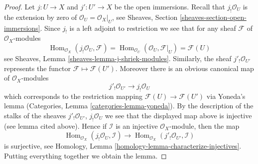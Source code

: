 \documentclass[10pt,a4paper]{amsart}
\theoremstyle{plain}
\theoremstyle{definition}
\theoremstyle{remark}
\numberwithin{equation}{subsection}
\def\Hom{\mathop{\mathrm{Hom}}\nolimits}
\begin{document}
\begin{proof}
Let $j : U \to X$ and $j' : U' \to X$ be the open immersions.
Recall that $j_!\mathcal{O}_U$ is the extension by zero of
$\mathcal{O}_U = \mathcal{O}_X|_U$, see
Sheaves, Section \ref{sheaves-section-open-immersions}.
Since $j_!$ is a left adjoint to restriction we see that
for any sheaf $\mathcal{F}$ of $\mathcal{O}_X$-modules
$$
\Hom_{\mathcal{O}_X}(j_!\mathcal{O}_U, \mathcal{F})
=
\Hom_{\mathcal{O}_U}(\mathcal{O}_U, \mathcal{F}|_U)
=
\mathcal{F}(U)
$$
see Sheaves, Lemma \ref{sheaves-lemma-j-shriek-modules}.
Similarly, the sheaf $j'_!\mathcal{O}_{U'}$ represents the
functor $\mathcal{F} \mapsto \mathcal{F}(U')$.
Moreover there
is an obvious canonical map of $\mathcal{O}_X$-modules
$$
j'_!\mathcal{O}_{U'} \longrightarrow j_!\mathcal{O}_U
$$
which corresponds to the restriction mapping
$\mathcal{F}(U) \to \mathcal{F}(U')$ via Yoneda's lemma
(Categories, Lemma \ref{categories-lemma-yoneda}). By the description
of the stalks of the sheaves
$j'_!\mathcal{O}_{U'}$, $j_!\mathcal{O}_U$
we see that the displayed map above is injective (see lemma cited above).
Hence if $\mathcal{I}$ is an injective $\mathcal{O}_X$-module,
then the map
$$
\Hom_{\mathcal{O}_X}(j_!\mathcal{O}_U, \mathcal{I})
\longrightarrow
\Hom_{\mathcal{O}_X}(j'_!\mathcal{O}_{U'}, \mathcal{I})
$$
is surjective, see
Homology, Lemma \ref{homology-lemma-characterize-injectives}.
Putting everything together we obtain the lemma.
\end{proof}
\end{document}
